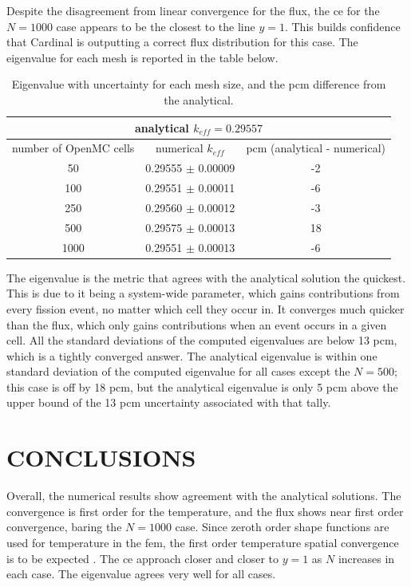 \documentclass[letterpaper]{mc2023}
\begin{document}
Despite the disagreement from linear convergence for the flux, the \gls{ce} for the $N=1000$ case appears to be the closest to the line $y=1$. This
builds confidence that Cardinal is outputting a correct flux distribution for this case. The eigenvalue for each mesh is reported in the table below.
\begin{table}[H]
    \centering
    \caption{Eigenvalue with uncertainty for each mesh size, and the pcm difference from the analytical.}
    \begin{tabular}{@{}ccc@{}}
        \toprule
        \multicolumn{3}{c}{analytical $k_{eff}=0.29557$} \\
        \midrule
        number of OpenMC cells & numerical $k_{eff}$ & pcm (analytical - numerical)\\
        \midrule
        50 & 0.29555 $\pm$ 0.00009 & -2 \\
        100 & 0.29551 $\pm$ 0.00011 & -6 \\
        250 & 0.29560  $\pm$ 0.00012 &  -3 \\
        500 & 0.29575 $\pm$ 0.00013 & 18 \\
        1000 & 0.29551 $\pm$ 0.00013 & -6 \\
        \bottomrule
    \end{tabular}
    \label{tab:data}
\end{table}
The eigenvalue is the metric that agrees with the analytical solution the quickest. This is due to it being a system-wide parameter, which gains
contributions from every fission event, no matter which cell they occur in. It converges much quicker than the flux, which only gains contributions
when an event occurs in a given cell. All the standard deviations of the computed eigenvalues are below 13 pcm, which is a tightly converged answer.
The analytical eigenvalue is within one standard deviation of the computed eigenvalue for all cases except the $N=500$; this case is off by 18 pcm,
but the analytical eigenvalue is only 5 pcm above the upper bound of the 13 pcm uncertainty associated with that tally.

\section{CONCLUSIONS}\label{sec:conclusions}

Overall, the numerical results show agreement with the analytical solutions. The convergence is first order for the temperature, and the flux shows
near first order convergence, baring the $N=1000$ case. Since zeroth order shape functions are used for temperature in the \gls{fem}, the first order
temperature spatial convergence is to be expected \cite{moose-convergence}. The \gls{ce} approach closer and closer to $y=1$ as $N$ increases in
each case. The eigenvalue agrees very well for all cases.
\end{document}
